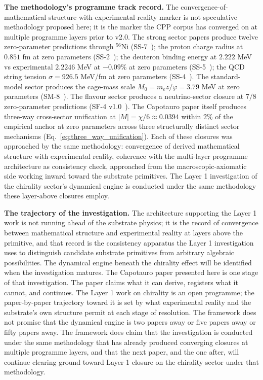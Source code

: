 \documentclass[11pt,letterpaper]{article}
\newcommand{\phig}{\varphi}
\begin{document}
\textbf{The methodology's programme track record.} The convergence-of-mathematical-structure-with-experimental-reality marker is not speculative methodology proposed here; it is the marker the CPP corpus has converged on at multiple programme layers prior to v2.0. The strong sector papers produce twelve zero-parameter predictions through $^{56}$Ni (SS-7~\cite{abshier_ss7}); the proton charge radius at $0.851$ fm at zero parameters (SS-2~\cite{abshier_ss2}); the deuteron binding energy at $2.222$ MeV vs experimental $2.2246$ MeV at $-0.09\%$ at zero parameters (SS-5~\cite{abshier_ss5}); the QCD string tension $\sigma = 926.5$ MeV/fm at zero parameters (SS-4~\cite{abshier_ss4}). The standard-model sector produces the cage-mass scale $M_0 = m_e z/\phig = 3.79$ MeV at zero parameters (SM-8~\cite{abshier_sm8}). The flavour sector produces a neutrino-sector closure at $7/8$ zero-parameter predictions (SF-4 v1.0~\cite{abshier_sf4}). The Capotauro paper itself produces three-way cross-sector unification at $|M| = \chi/6 \approx 0.0394$ within $2\%$ of the empirical anchor at zero parameters across three structurally distinct sector mechanisms (Eq.~\eqref{eq:three_way_unification}). Each of these closures was approached by the same methodology: convergence of derived mathematical structure with experimental reality, coherence with the multi-layer programme architecture as consistency check, approached from the macroscopic-axiomatic side working inward toward the substrate primitives. The Layer 1 investigation of the chirality sector's dynamical engine is conducted under the same methodology these layer-above closures employ.

\textbf{The trajectory of the investigation.} The architecture supporting the Layer 1 work is not running ahead of the substrate physics; it is the record of convergence between mathematical structure and experimental reality at layers above the primitive, and that record is the consistency apparatus the Layer 1 investigation uses to distinguish candidate substrate primitives from arbitrary algebraic possibilities. The dynamical engine beneath the chirality effect will be identified when the investigation matures. The Capotauro paper presented here is one stage of that investigation. The paper claims what it can derive, registers what it cannot, and continues. The Layer 1 work on chirality is an open programme; the paper-by-paper trajectory toward it is set by what experimental reality and the substrate's own structure permit at each stage of resolution. The framework does not promise that the dynamical engine is two papers away or five papers away or fifty papers away. The framework does claim that the investigation is conducted under the same methodology that has already produced converging closures at multiple programme layers, and that the next paper, and the one after, will continue clearing ground toward Layer 1 closure on the chirality sector under that methodology.
\end{document}
